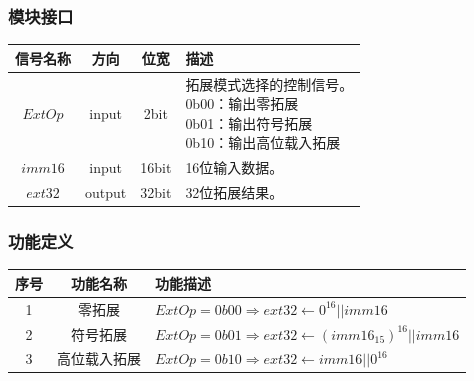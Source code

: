 \documentclass[main.tex]{subfiles}
\begin{document}
\subsubsection{模块接口}
\begin{center}
    \begin{tabular}[]{c c c l}
        \toprule
        信号名称 & 方向 & 位宽 & 描述 \\
        \midrule
        $ExtOp$ & input & 2bit & \makecell[lt]{
            拓展模式选择的控制信号。\\
            0b00：输出零拓展 \\
            0b01：输出符号拓展 \\
            0b10：输出高位载入拓展 \\
        } \\
        \midrule
        $imm16$ & input & 16bit & 16位输入数据。\\
        $ext32$ & output & 32bit & 32位拓展结果。 \\
        \bottomrule
    \end{tabular}
\end{center}

\subsubsection{功能定义}
\begin{center}
    \begin{tabular}{c c l}
        \toprule
        序号 & 功能名称 & 功能描述 \\
        \midrule
        1 & 零拓展 & $ExtOp = 0b00 \Rightarrow ext32 \leftarrow 0^{16} || imm16$ \\
        2 & 符号拓展 & $ExtOp = 0b01 \Rightarrow ext32 \leftarrow \left(imm16_{15}\right)^{16} || imm16$ \\
        3 & 高位载入拓展 & $ExtOp = 0b10 \Rightarrow ext32 \leftarrow imm16 || 0^{16}$\\
        \bottomrule
    \end{tabular}
\end{center}
\end{document}
